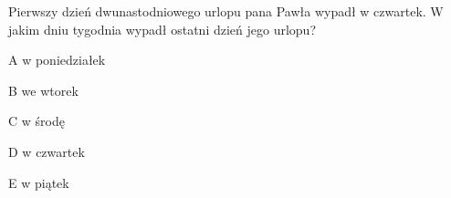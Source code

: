\begin{tresc}
Pierwszy dzień dwunastodniowego urlopu pana Pawła wypadł w czwartek. W jakim dniu tygodnia wypadł ostatni dzień jego urlopu?
\end{tresc}
\begin{wariant}{A} w poniedziałek \end{wariant}
\begin{wariant}{B} we wtorek \end{wariant}
\begin{wariant}{C} w środę \end{wariant}
\begin{wariant}{D} w czwartek \end{wariant}
\begin{wariant}{E} w piątek \end{wariant}
